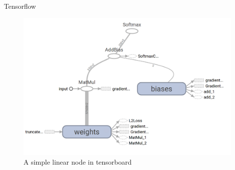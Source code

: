 \documentclass{beamer}
\begin{document}
\begin{frame}{Tensorflow}
\begin{figure}
\centering
\includegraphics[width=0.7\linewidth]{../png/net1}
\caption{A simple linear node in tensorboard}
\label{fig:net1}
\end{figure}
\end{frame}
\end{document}
